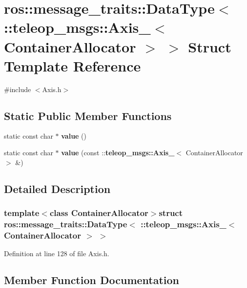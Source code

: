 \section{ros::message\_\-traits::DataType$<$ ::teleop\_\-msgs::Axis\_\-$<$ ContainerAllocator $>$ $>$ Struct Template Reference}
\label{structros_1_1message__traits_1_1DataType_3_01_1_1teleop__msgs_1_1Axis___3_01ContainerAllocator_01_4_01_4}


{\ttfamily \#include $<$Axis.h$>$}

\subsection*{Static Public Member Functions}
\begin{DoxyCompactItemize}
\item 
static const char $\ast$ {\bf value} ()
\item 
static const char $\ast$ {\bf value} (const ::{\bf teleop\_\-msgs::Axis\_\-}$<$ ContainerAllocator $>$ \&)
\end{DoxyCompactItemize}


\subsection{Detailed Description}
\subsubsection*{template$<$class ContainerAllocator$>$struct ros::message\_\-traits::DataType$<$ ::teleop\_\-msgs::Axis\_\-$<$ ContainerAllocator $>$ $>$}



Definition at line 128 of file Axis.h.



\subsection{Member Function Documentation}
